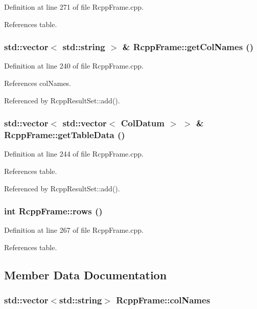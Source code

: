 Definition at line 271 of file RcppFrame.cpp.

References table.\hypertarget{classRcppFrame_a63b20515817f4c3564e3da199e418fcd}{
\subsubsection[{getColNames}]{\setlength{\rightskip}{0pt plus 5cm}std::vector$<$ std::string $>$ \& RcppFrame::getColNames ()}}
\label{classRcppFrame_a63b20515817f4c3564e3da199e418fcd}


Definition at line 240 of file RcppFrame.cpp.

References colNames.

Referenced by RcppResultSet::add().\hypertarget{classRcppFrame_ab18624be30cfa934ca0ad2152cff6d41}{
\subsubsection[{getTableData}]{\setlength{\rightskip}{0pt plus 5cm}std::vector$<$ std::vector$<$ {\bf ColDatum} $>$ $>$ \& RcppFrame::getTableData ()}}
\label{classRcppFrame_ab18624be30cfa934ca0ad2152cff6d41}


Definition at line 244 of file RcppFrame.cpp.

References table.

Referenced by RcppResultSet::add().\hypertarget{classRcppFrame_aa33ab9553bb9fa510c338a3e092d9ace}{
\subsubsection[{rows}]{\setlength{\rightskip}{0pt plus 5cm}int RcppFrame::rows ()}}
\label{classRcppFrame_aa33ab9553bb9fa510c338a3e092d9ace}


Definition at line 267 of file RcppFrame.cpp.

References table.

\subsection{Member Data Documentation}
\hypertarget{classRcppFrame_a9b549d377248896848b6abcb8df64f82}{
\subsubsection[{colNames}]{\setlength{\rightskip}{0pt plus 5cm}std::vector$<$std::string$>$ {\bf RcppFrame::colNames}}}
\label{classRcppFrame_a9b549d377248896848b6abcb8df64f82}


